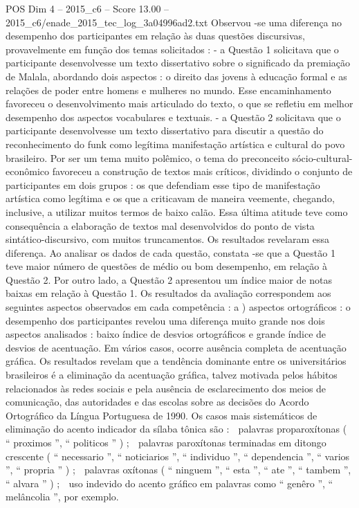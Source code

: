 \begin{textsample}{POS Dim 4 – 2015\_c6 – Score 13.00 – 2015\_c6/enade\_2015\_tec\_log\_3a04996ad2.txt}
Observou -se uma diferença no desempenho dos participantes em relação às duas questões discursivas, provavelmente em função dos temas solicitados : - a Questão 1 solicitava que o participante desenvolvesse um texto dissertativo sobre o significado da premiação de Malala, abordando dois aspectos : o direito das jovens à educação formal e as relações de poder entre homens e mulheres no mundo.
Esse encaminhamento favoreceu o desenvolvimento mais articulado do texto, o que se refletiu em melhor desempenho dos aspectos vocabulares e textuais. - a Questão 2 solicitava que o participante desenvolvesse um texto dissertativo para discutir a questão do reconhecimento do funk como legítima manifestação artística e cultural do povo brasileiro.
Por ser um tema muito polêmico, o tema do preconceito sócio-cultural-econômico favoreceu a construção de textos mais críticos, dividindo o conjunto de participantes em dois grupos : os que defendiam esse tipo de manifestação artística como legítima e os que a criticavam de maneira veemente, chegando, inclusive, a utilizar muitos termos de baixo calão.
Essa última atitude teve como consequência a elaboração de textos mal desenvolvidos do ponto de vista sintático-discursivo, com muitos truncamentos.
Os resultados revelaram essa diferença.
Ao analisar os dados de cada questão, constata -se que a Questão 1 teve maior número de questões de médio ou bom desempenho, em relação à Questão 2.
Por outro lado, a Questão 2 apresentou um índice maior de notas baixas em relação à Questão 1.
Os resultados da avaliação correspondem aos seguintes aspectos observados em cada competência : a ) aspectos ortográficos : o desempenho dos participantes revelou uma diferença muito grande nos dois aspectos analisados : baixo índice de desvios ortográficos e grande índice de desvios de acentuação.
Em vários casos, ocorre ausência completa de acentuação gráfica.
Os resultados revelam que a tendência dominante entre os universitários brasileiros é a eliminação da acentuação gráfica, talvez motivada pelos hábitos relacionados às redes sociais e pela ausência de esclarecimento dos meios de comunicação, das autoridades e das escolas sobre as decisões do Acordo Ortográfico da Língua Portuguesa de 1990.
Os casos mais sistemáticos de eliminação do acento indicador da sílaba tônica são :  palavras proparoxítonas ( “ proximos ”, “ politicos ” ) ;  palavras paroxítonas terminadas em ditongo crescente ( “ necessario ”, “ noticiarios ”, “ individuo ”, “ dependencia ”, “ varios ”, “ propria ” ) ;  palavras oxítonas ( “ ninguem ”, “ esta ”, “ ate ”, “ tambem ”, “ alvara ” ) ;  uso indevido do acento gráfico em palavras como “ genêro ”, “ melâncolia ”, por exemplo.

\end{textsample}

